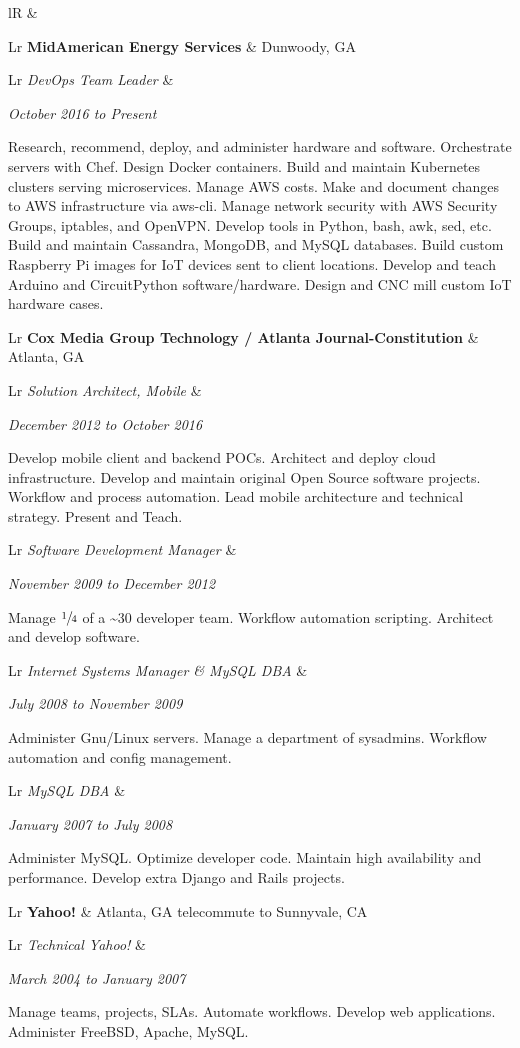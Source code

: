 \documentclass[letterpaper,10pt]{article}
\newcommand{\sizeF}[0]{\fontsize{11pt}{13pt}\selectfont}
\newcounter{skipfirstcounter}
\newcommand{\skipfirst}[1]{
    \ifthenelse{\equal{\value{skipfirstcounter}}{0}}{#1}{#1}
    \addtocounter{skipfirstcounter}{1}
}
\newcommand{\blocktitle}[1]{
    \setcounter{skipfirstcounter}{0}
    \begin{tabularx}{\textwidth}{lR}
        {\sizeF\sc{#1}} & \noindent\hrulefill\\
    \end{tabularx}
}
\newcommand{\blockExperience}[1]{
    \blocktitle{Career}%
    #1%
    \vspace{2mm}%
}
\newcommand{\sectionheaderfirst}[2]{
    \begin{tabularx}{\textwidth}{Lr}%
    \textbf{#1} & #2\\%
    \end{tabularx}%
}
\newcommand{\sectionheader}[2]{
    \vspace{2mm}%
    \sectionheaderfirst{#1}{#2}%
}
\newcommand{\sectionsub}[2]{
    {\def\arraystretch{1}
        \begin{tabularx}{\textwidth}{Lr}
        \rowcolor[rgb]{.9,.9,.9}
        \emph{#1} &
        \rule{0mm}{3.2mm} %
        \emph{#2} \\
        \addlinespace[0.4mm]
        \end{tabularx}
    }
}
\newcommand{\sectionbody}[1]{
    #1
    \vspace{1mm}
}
\begin{document}
\blockExperience{
    \sectionheaderfirst
    {MidAmerican Energy Services}{Dunwoody, GA}
    \sectionsub
    {DevOps Team Leader}
    {October 2016 to Present}
    \sectionbody{
    Research, recommend, deploy, and administer hardware and software.
    Orchestrate servers with Chef.
    Design Docker containers.
    Build and maintain Kubernetes clusters serving microservices.
    Manage AWS costs.
    Make and document changes to AWS infrastructure via aws-cli.
    Manage network security with AWS Security Groups, iptables, and OpenVPN.
    Develop tools in Python, bash, awk, sed, etc.
    Build and maintain Cassandra, MongoDB, and MySQL databases.
    Build custom Raspberry Pi images for IoT devices sent to client locations.
    Develop and teach Arduino and CircuitPython software/hardware.
    Design and CNC mill custom IoT hardware cases.
    }

    \sectionheader
    {Cox Media Group Technology / Atlanta Journal-Constitution}{Atlanta, GA}
    \sectionsub
    {Solution Architect, Mobile}
    {December 2012 to October 2016}
    \sectionbody{
    Develop mobile client and backend POCs.
    Architect and deploy cloud infrastructure.
    Develop and maintain original Open Source software projects.
    Workflow and process automation.
    Lead mobile architecture and technical strategy.
    Present and Teach.
    }

    \sectionsub
    {Software Development Manager}
    {November 2009 to December 2012}
    \sectionbody{
    Manage $\sfrac{1}{4}$ of a \~{}30 developer team.
    Workflow automation scripting.
    Architect and develop software.
    }

    \sectionsub
    {Internet Systems Manager \& MySQL DBA}
    {July 2008 to November 2009}
    \sectionbody{
    Administer Gnu/Linux servers.
    Manage a department of sysadmins.
    Workflow automation and config management.
    }

    \sectionsub
    {MySQL DBA}
    {January 2007 to July 2008}
    \sectionbody{
    Administer MySQL.
    Optimize developer code.
    Maintain high availability and performance.
    Develop extra Django and Rails projects.
    }

    \sectionheader
    {Yahoo!}{Atlanta, GA telecommute to Sunnyvale, CA}
    \sectionsub
    {Technical Yahoo!}
    {March 2004 to January 2007}
    \sectionbody{
    Manage teams, projects, SLAs.
    Automate workflows.
    Develop web applications.
    Administer FreeBSD, Apache, MySQL.
    }

}
\end{document}
